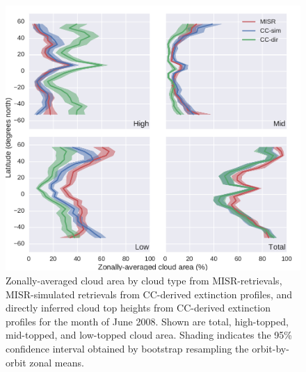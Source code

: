\begin{figure}
\centering
\includegraphics[width=\columnwidth]{graphics/misr_cldmisr_zonal_2008-06.pdf}
\caption{Zonally-averaged cloud area by cloud type from MISR-retrievals, MISR-simulated retrievals from CC-derived extinction profiles, and directly inferred cloud top heights from CC-derived extinction profiles for the month of June 2008. Shown are total, high-topped, mid-topped, and low-topped cloud area. Shading indicates the 95\% confidence interval obtained by bootstrap resampling the orbit-by-orbit zonal means.}
\label{misr_cldmisr_zonal_jun}
\end{figure}

